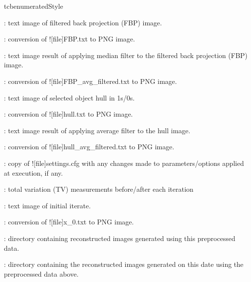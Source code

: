 \begin{tcbenvironment}
\begin{tcbparbox}{tcbenumeratedStyle}
\begin{ThinEnum}
\begin{ThinEnum}
\begin{ThinEnum}
\begin{ThinEnum}
\begin{ThinEnum}
\begin{ThinEnum}
\begin{ThinEnum}
\begin{ThinEnum}
\begin{ThinEnum}
                                            \item {} : text image of filtered back projection (FBP) image.
                                            \item {} : conversion of \docentry![file]{FBP.txt} to PNG image.
                                            \item {} : text image result of applying median filter to the filtered back projection (FBP) image.
                                            \item {} : conversion of \docentry![file]{FBP\_avg\_filtered.txt} to PNG image.
                                            \item {} : text image of selected object hull in 1s/0s.
                                            \item {} : conversion of \docentry![file]{hull.txt} to PNG image.
                                            \item {} : text image result of applying average filter to the hull image.
                            \item {} : conversion of \docentry![file]{hull\_avg\_filtered.txt} to PNG image.
                            \item {} : copy of \docentry![file]{settings.cfg} with any changes made to parameters/options applied at execution, if any.
                                            \item {} : total variation (TV) measurements before/after each iteration
                                            \item {} : text image of initial iterate.
                                        \item {} : conversion of \docentry![file]{x\_0.txt} to PNG image.
                                        \item {} : directory containing reconstructed images generated using this preprocessed data.
                                        \begin{ThinEnum}
                                            \item {} : directory containing the reconstructed images generated on this date using the preprocessed data above.

\end{ThinEnum}
\end{ThinEnum}
\end{ThinEnum}
\end{ThinEnum}
\end{ThinEnum}
\end{ThinEnum}
\end{ThinEnum}
\end{ThinEnum}
\end{ThinEnum}
\end{ThinEnum}
\end{tcbparbox}
\end{tcbenvironment}
